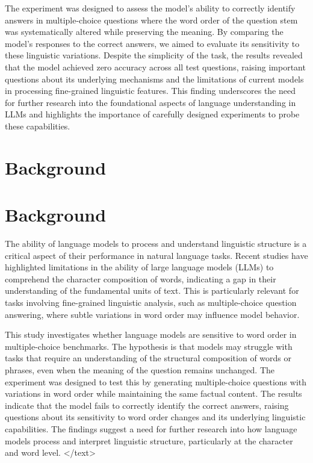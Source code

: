 \documentclass{article}
\begin{document}
The experiment was designed to assess the model's ability to correctly identify answers in multiple-choice questions where the word order of the question stem was systematically altered while preserving the meaning. By comparing the model's responses to the correct answers, we aimed to evaluate its sensitivity to these linguistic variations. Despite the simplicity of the task, the results revealed that the model achieved zero accuracy across all test questions, raising important questions about its underlying mechanisms and the limitations of current models in processing fine-grained linguistic features. This finding underscores the need for further research into the foundational aspects of language understanding in LLMs and highlights the importance of carefully designed experiments to probe these capabilities.
\section{Background}
\section*{Background}

The ability of language models to process and understand linguistic structure is a critical aspect of their performance in natural language tasks. Recent studies have highlighted limitations in the ability of large language models (LLMs) to comprehend the character composition of words, indicating a gap in their understanding of the fundamental units of text. This is particularly relevant for tasks involving fine-grained linguistic analysis, such as multiple-choice question answering, where subtle variations in word order may influence model behavior. 

This study investigates whether language models are sensitive to word order in multiple-choice benchmarks. The hypothesis is that models may struggle with tasks that require an understanding of the structural composition of words or phrases, even when the meaning of the question remains unchanged. The experiment was designed to test this by generating multiple-choice questions with variations in word order while maintaining the same factual content. The results indicate that the model fails to correctly identify the correct answers, raising questions about its sensitivity to word order changes and its underlying linguistic capabilities. The findings suggest a need for further research into how language models process and interpret linguistic structure, particularly at the character and word level.
</text>
\end{document}
